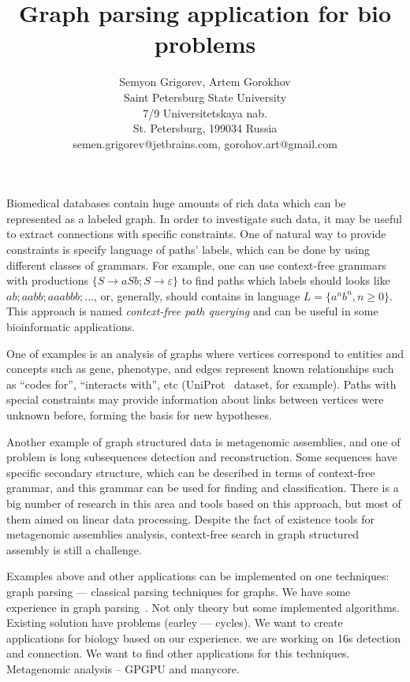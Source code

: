 \documentclass[12pt]{article}  %
\title{Graph parsing application for bio problems}
\author{Semyon Grigorev, Artem Gorokhov
\\
       {Saint Petersburg State University}\\
       {7/9 Universitetskaya nab.}\\
       {St. Petersburg, 199034 Russia}\\
       semen.grigorev@jetbrains.com, gorohov.art@gmail.com
       }
\date{}
\theoremstyle{definition}
\theoremstyle{remark}
\begin{document}
\maketitle

Biomedical databases contain huge amounts of rich data which can be represented as a labeled graph.
In order to investigate such data, it may be useful to extract connections with specific constraints.
One of natural way to provide constraints is specify language of paths' labels, which can be done by using different classes of grammars.
For example, one can use context-free grammars with productions $\{S \rightarrow a S b; S \rightarrow \varepsilon \}$ to find paths which labels should looks like $ab; aabb; aaabbb; ...$, or, generally, should contains in language $L = \{a^n b^n, n \geq 0\}$.
This approach is named \emph{context-free path querying} and can be useful in some bioinformatic applications.

One of examples is an analysis of graphs where vertices correspond to entities and concepts such as gene, phenotype, and edges represent known relationships such as ``codes for'', ``interacts with'', etc (UniProt~\cite{UniProt} dataset, for example).
Paths with special constraints may provide information about links between vertices were unknown before, forming the basis for new hypotheses.

Another example of graph structured data is metagenomic assemblies, and one of problem is long subsequences detection and reconstruction.
Some sequences have specific secondary structure, which can be described in terms of context-free grammar, and this grammar can be used for finding and classification.
There is a big number of research in this area and tools based on this approach, but most of them aimed on linear data processing. 
Despite the fact of existence tools for metagenomic assemblies analysis, context-free search in graph structured assembly is still a challenge.


Examples above and other applications can be implemented on one techniques: graph parsing --- classical parsing techniques for graphs.
We have some experience in graph parsing~\cite{GraphGLL, RelaxedRNGLR}.
Not only theory but some implemented algorithms.
Existing solution have problems (earley --- cycles).
We want to create applications for biology based on our experience. 
we are working on 16s detection and connection.
We want to find other applications for this techniques.
Metagenomic analysis -- GPGPU and manycore. 
\end{document}

